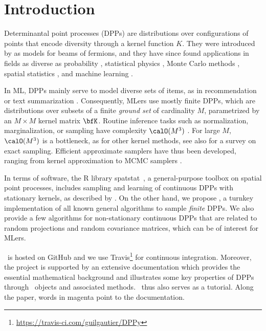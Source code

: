 \section{Introduction} %
\label{sec:introduction}

Determinantal point processes (DPPs) are distributions over configurations of points that encode diversity through a kernel function $K$.
They were introduced by \citet{Mac75} as models for beams of fermions, and they have since found applications in fields as diverse as probability \citep{Sos00, Kon05, HKPV06}, statistical physics \citep{PaBe11}, Monte Carlo methods \citep{BaHa16}, spatial statistics \citep{LaMoRu15}, and machine learning \citep[ML,][]{KuTa12}.

In ML, DPPs mainly serve to model diverse sets of items, as in recommendation \citep{KaDeKo16, GaPaKo16} or text summarization \citep{DuBa18}.
Consequently, MLers  use mostly finite DPPs, which are distributions over subsets of a finite \emph{ground set} of cardinality $M$, parametrized by an $M\times M$ kernel matrix $\bfK$.
Routine inference tasks such as normalization, marginalization, or sampling have complexity $\calO(M^3)$ \citep{KuTa12}.
For large $M$, $\calO(M^3)$ is a bottleneck, as for other kernel methods, see also \citet{TrBaAm18} for a survey on exact sampling.
Efficient approximate samplers have thus been developed, ranging from kernel approximation \citep{AKFT13} to MCMC samplers \citep{AnGhRe16, LiJeSr16c, GaBaVa17}.

In terms of software, the R library \textsf{spatstat}\ \citep{BaTu05}, a general-purpose toolbox on spatial point processes, includes sampling and learning of continuous DPPs with stationary kernels, as described by \citet{LaMoRu15}.
On the other hand, we propose \DPPy, a turnkey implementation of all known general algorithms to sample \emph{finite} DPPs.
We also provide a few algorithms for non-stationary continuous DPPs that are related to random projections and random covariance matrices, which can be of interest for MLers.

\DPPy\ is hosted on GitHub\!
and we use \setcounter{footnote}{5}Travis\footnote{\url{https://travis-ci.com/guilgautier/DPPy}} for continuous integration.
Moreover, the project is supported by an extensive documentation which provides the essential mathematical background and illustrates some key properties of DPPs through \DPPy\ objects and associated methods.
\DPPy\ thus also serves as a tutorial.
Along the paper, words in magenta point to the documentation.

